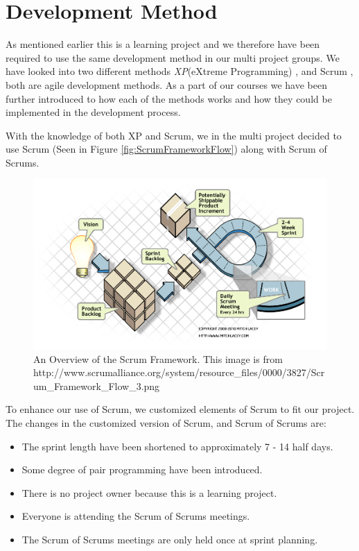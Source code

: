 \section{Development Method}

As mentioned earlier this is a learning project and we therefore have been required to use the same development method in our multi project groups. We have looked into two different methods \textit{XP}(eXtreme Programming) \cite{XP}, and Scrum \cite{SCRUM}, both are agile development methods.
As a part of our courses we have been further introduced to how each of the methods works and how they could be implemented in the development process. 

With the knowledge of both XP and Scrum, we in the multi project decided to use Scrum (Seen in Figure \vref{fig:ScrumFrameworkFlow}) along with Scrum of Scrums. 

\begin{figure}[ht]
	\centering
		\includegraphics[scale = 0.45]{images/ScrumFrameworkFlow.png}
	\caption{An Overview of the Scrum Framework. This image is from http://www.scrumalliance.org/system/resource\_files/0000/3827/Scrum\_Framework\_Flow\_3.png}
	\label{fig:ScrumFrameworkFlow}
\end{figure}

To enhance our use of Scrum, we customized elements of Scrum to fit our project. The changes in the customized version of Scrum, and Scrum of Scrums are:
\begin{itemize}
	\item The sprint length have been shortened to approximately 7 - 14 half days.
	\item Some degree of pair programming have been introduced.
	\item There is no project owner because this is a learning project.
	\item Everyone is attending the Scrum of Scrums meetings.
	\item The Scrum of Scrums meetings are only held once at sprint planning.
\end{itemize}

